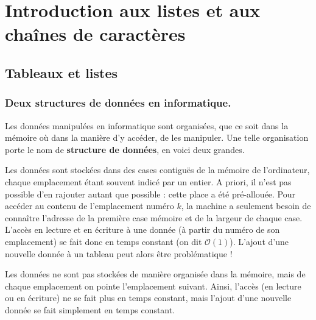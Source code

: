 \setchapterpreamble[u]{\margintoc}
\chapter{Introduction aux listes et aux chaînes de caractères}



\section{Tableaux et listes}

\subsection{Deux structures de données en informatique.}

Les données manipulées en informatique sont organisées, que ce soit dans la mémoire où dans la manière d'y accéder, de les manipuler. 
Une telle organisation porte le nom de \textbf{structure de données}, en voici deux grandes.  

\begin{defi}[Tableaux]
  Les données sont stockées dans des cases contiguës de la mémoire de l'ordinateur, chaque emplacement étant souvent indicé par un entier. 
    A priori, il n'est pas possible d'en rajouter autant que possible : cette place a été pré-allouée. 
    Pour accéder au contenu de l'emplacement numéro $k$, la machine a seulement besoin de connaître 
l'adresse de la première case mémoire et de la largeur de chaque case. 
    L'accès en lecture et en écriture à une donnée (à partir du numéro de son emplacement) se fait donc en temps constant (on dit $\mathcal{O}(1)$).
    L'ajout d'une nouvelle donnée à un tableau peut alors être problématique !
\end{defi}

\begin{defi}
Les données ne sont pas stockées de manière organisée dans la mémoire, 
mais de chaque emplacement on pointe l'emplacement suivant. 
    Ainsi, l'accès (en lecture ou en écriture) ne se fait plus en temps constant, mais l'ajout d'une nouvelle donnée se fait simplement en temps constant. 
\end{defi}

